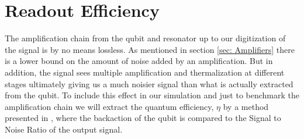 


\section{Readout Efficiency}
The amplification chain from the qubit and resonator up to our digitization of the signal is by no means lossless. As mentioned in section \ref{sec: Amplifiers} there is a lower bound on the amount of noise added by an amplification. But in addition, the signal sees multiple amplification and thermalization at different stages ultimately giving us a much noisier signal than what is actually extracted from the qubit. To include this effect in our simulation and just to benchmark the amplification chain we will extract the quantum efficiency, $\eta$ by a method presented in \cite{bultink}, where the backaction of the qubit is compared to the Signal to Noise Ratio of the output signal. 

